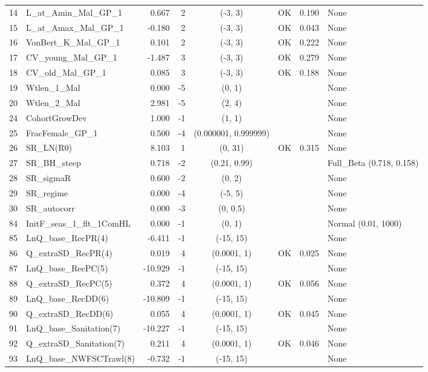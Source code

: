 \documentclass[12pt,]{article}
\begin{document}
\begin{landscape}
\begin{longtable}{rlrrcccl}
  14 & L\_at\_Amin\_Mal\_GP\_1 & 0.667 & 2 & (-3, 3) & OK & 0.190 & None \\ 
  15 & L\_at\_Amax\_Mal\_GP\_1 & -0.180 & 2 & (-3, 3) & OK & 0.043 & None \\ 
  16 & VonBert\_K\_Mal\_GP\_1 & 0.101 & 2 & (-3, 3) & OK & 0.222 & None \\ 
  17 & CV\_young\_Mal\_GP\_1 & -1.487 & 3 & (-3, 3) & OK & 0.279 & None \\ 
  18 & CV\_old\_Mal\_GP\_1 & 0.085 & 3 & (-3, 3) & OK & 0.188 & None \\ 
  19 & Wtlen\_1\_Mal & 0.000 & -5 & (0, 1) &  &  & None \\ 
  20 & Wtlen\_2\_Mal & 2.981 & -5 & (2, 4) &  &  & None \\ 
  24 & CohortGrowDev & 1.000 & -1 & (1, 1) &  &  & None \\ 
  25 & FracFemale\_GP\_1 & 0.500 & -4 & (0.000001, 0.999999) &  &  & None \\ 
  26 & SR\_LN(R0) & 8.103 & 1 & (0, 31) & OK & 0.315 & None \\ 
  27 & SR\_BH\_steep & 0.718 & -2 & (0.21, 0.99) &  &  & Full\_Beta (0.718, 0.158) \\ 
  28 & SR\_sigmaR & 0.600 & -2 & (0, 2) &  &  & None \\ 
  29 & SR\_regime & 0.000 & -4 & (-5, 5) &  &  & None \\ 
  30 & SR\_autocorr & 0.000 & -3 & (0, 0.5) &  &  & None \\ 
  84 & InitF\_seas\_1\_flt\_1ComHL & 0.000 & -1 & (0, 1) &  &  & Normal (0.01, 1000) \\ 
  85 & LnQ\_base\_RecPR(4) & -6.411 & -1 & (-15, 15) &  &  & None \\ 
  86 & Q\_extraSD\_RecPR(4) & 0.019 & 4 & (0.0001, 1) & OK & 0.025 & None \\ 
  87 & LnQ\_base\_RecPC(5) & -10.929 & -1 & (-15, 15) &  &  & None \\ 
  88 & Q\_extraSD\_RecPC(5) & 0.372 & 4 & (0.0001, 1) & OK & 0.056 & None \\ 
  89 & LnQ\_base\_RecDD(6) & -10.809 & -1 & (-15, 15) &  &  & None \\ 
  90 & Q\_extraSD\_RecDD(6) & 0.055 & 4 & (0.0001, 1) & OK & 0.045 & None \\ 
  91 & LnQ\_base\_Sanitation(7) & -10.227 & -1 & (-15, 15) &  &  & None \\ 
  92 & Q\_extraSD\_Sanitation(7) & 0.211 & 4 & (0.0001, 1) & OK & 0.046 & None \\ 
  93 & LnQ\_base\_NWFSCTrawl(8) & -0.732 & -1 & (-15, 15) &  &  & None \\ 

\end{longtable}
\end{landscape}
\end{document}
